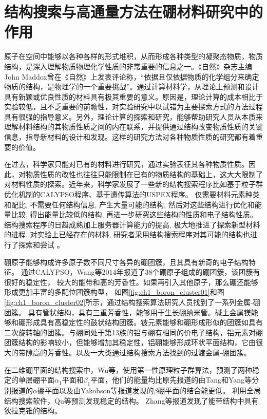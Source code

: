 \section{结构搜索与高通量方法在硼材料研究中的作用}

原子在空间中能够以各种各样的形式堆积，从而形成各种类型的凝聚态物质，物质结构，是深入理解物质物理化学性质的非常重要的信息之一。《自然》杂志主编John Maddox曾在《自然》上发表评论称，“依据且仅依据物质的化学组分来确定物质的结构，是物理学的一个重要挑战”。通过计算材料学，从理论上预测和设计具有新颖或优良性质的材料具有极其重要的意义。原因是，理论计算的成本相比于实验较低，且不乏重要的前瞻性，对实验研究中以试错为主要探索方式的方法过程具有很强的指导意义。另外，理论计算的探索和研究，能够帮助研究人员从本质来理解材料结构的其物质性质之间的内在联系，并提供通过结构改变物质性质的关键信息，指导新材料的设计和发现。这样的研究方法对各种物质性质的研究都有着重要的价值。

在过去，科学家只能对已有的材料进行研究，通过实验表征其各种物质性质。因此，对物质性质的改性也往往只能限制在已有的物质结构的基础上，这大大限制了对材料性质的探索。近年来，科学家发展了一些新的结构搜索程序比如基于粒子群优化机制的CALYPSO程序\cite{wang2012calypso}、基于遗传算法的USPEX程序\cite{glass2006uspex}。
仅需要材料元素种类和配比, 不需要任何结构信息, 产生大量可能的结构, 然后对这些结构进行优化和能量比较, 得出能量比较低的结构, 再进一步研究这些结构的性质和电子结构性质。结构搜索程序的日趋成熟加上服务器计算能力的提高, 极大地推进了探索新型材料的进程. 对实验上已经存在的材料, 研究者采用结构搜索程序对其可能的结构也进行了探索和尝试 。

硼原子能够构成许多原子数不同尺寸各异的硼团簇，且其具有新奇的电子结构特征。
通过CALYPSO，Wang等\cite{lv2014b38}2014年报道了38个硼原子组成的硼团簇，该团簇有很好的稳定性，
较大的能带和高的芳香性。如果再引入其他原子，那么硼还能够形成更加丰富的多配位团簇构型\cite{lv2015stabilization}，
如图\ref{fig:ch1_boron_cluster01}和图\ref{fig:ch1_boron_cluster02}所示，通过结构搜索算法研究人员找到了一系列金属-硼团簇。
\cite{dong2019li}具有管状结构，具有三重芳香性，能够用于生长硼纳米管。碱土金属镁能够和硼形成具有高稳定性的鼓状结构团簇\cite{tian2019exhaustive}。铍元素能够和硼形成形似的团簇如具有二次旋转轴的团簇\cite{kang2019probing}。与硼同处于第13族的铝与硼有相同的价电子结构，铝元素对硼团簇结构的影响较小，但能够增加其稳定性，铝硼能够形成环状平面结构\cite{jin2019structural}，它由很大的带隙高的芳香性。以及一大类通过结构搜索方法找到的过渡金属-硼团簇\cite{tian2019cluster}。

在二维硼平面的结构搜索中，Wu等\cite{wu2012two}，使用第一性原理粒子群算法，预测了两种稳定的单层硼平面$\alpha_1$平面和$\beta_1$平面，他们的能量均比原先报道的由Tang和Yang等\cite{tang2007novel,yang2008ab}分别报道的$\alpha$硼平面以及由Yakobson等\cite{penev2012polymorphism}报道发现的$\beta$硼平面的结合能更低。
利用全局结构搜索软件，Qu等预测发现稳定的结构。
Zhang等\cite{zhang2017dirac}报道发现了能带结构中具有狄拉克锥的结构。

